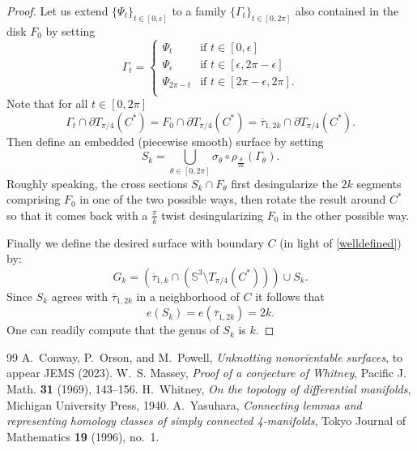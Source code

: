\documentclass[10pt,a4paper]{amsart}
\numberwithin{equation}{section}
\begin{document}
\begin{proof}
Let us extend $\{\Psi_t\}_{t\in [0,\epsilon]}$ to a family $\{\Gamma_t\}_{t\in [0,2\pi]}$ also contained in the disk $F_0$ by setting
\begin{equation}
\Gamma_t = 
\begin{cases} 
  \Psi_t & \text{if } t\in [0,\epsilon]\\ 
  
  \Psi_\epsilon& \text{if } t\in [\epsilon,2\pi-\epsilon]\\
  \Psi_{2\pi-t} & \text{if } t\in [2\pi-\epsilon,2\pi]. \\
\end{cases}
\end{equation}
Note that for all $t\in [0,2\pi]$
\begin{equation}\label{welldefined}
\Gamma_t\cap \partial T_{\pi/4}(C^*) = F_0\cap \partial T_{\pi/4}(C^*) =\overline{\tau}_{1,2k}\cap \partial T_{\pi/4}(C^*).
\end{equation} Then define an embedded (piecewise smooth) surface by setting
\begin{equation}
S_k=\bigcup_{\theta\in [0,2\pi]}\sigma_\theta \circ \rho_{\frac{\theta}{2k}}(\Gamma_\theta).
\end{equation}
Roughly speaking, the cross sections $S_k\cap F_\theta$ first desingularize the $2k$ segments comprising $F_0$ in one of the two possible ways, then rotate the result around $C^*$ so that it comes back with a $\frac{\pi}{k}$ twist desingularizing $F_0$ in the other possible way. 

Finally we define the desired surface with boundary $C$ (in light of \eqref{welldefined}) by:
\begin{equation}
G_k = (\overline{\tau}_{1,k}\cap (\mathbb{S}^3\setminus T_{\pi/4}(C^*)))\cup S_k.
\end{equation}
Since $S_k$ agrees with $\overline{\tau}_{1,2k}$ in a neighborhood of $C$ it follows that \begin{equation}e(S_k)=e(\overline{\tau}_{1,2k})=2k.\end{equation}  
One can readily compute that the genus of $S_k$ is $k$.
\end{proof}

\begin{thebibliography}{99}
 A.~Conway, P.~Orson, and M.~Powell, \emph{Unknotting nonorientable surfaces}, to appear JEMS (2023).
 W.~S. Massey, \emph{Proof of a conjecture of {W}hitney}, Pacific J. Math. \textbf{31} (1969), 143--156.
 H.~Whitney, \emph{On the topology of differential manifolds}, Michigan University Press, 1940.
 A.~Yasuhara, \emph{Connecting lemmas and representing homology classes of simply connected 4-manifolds}, Tokyo Journal of Mathematics \textbf{19} (1996), no.~1.
\end{thebibliography}
\end{document}
